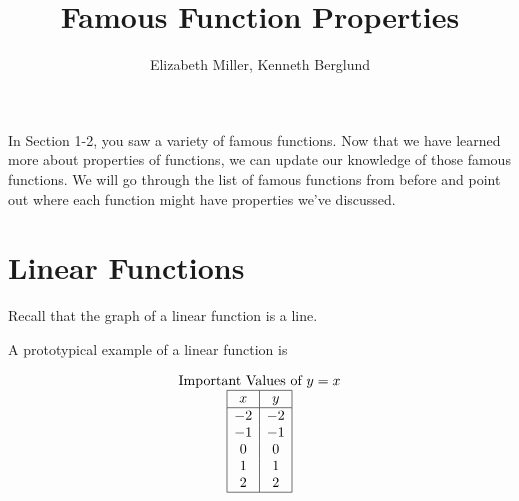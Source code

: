 \documentclass[nooutcomes]{ximera}
\author{Elizabeth Miller, Kenneth Berglund}
\title{Famous Function Properties}
\begin{document}
\begin{abstract}
\end{abstract}
\maketitle


In Section 1-2, you saw a variety of famous functions. Now that we have learned more about properties of functions, we can update our knowledge of those famous functions. We will go through the list of famous functions from before and point out where each function might have properties we've discussed.

\newpage


\section{Linear Functions}
Recall that the graph of a linear function is a line. 

\begin{example}
A prototypical example of a linear function is 

\begin{center}
\end{center}

\begin{center}
\end{center}


\[
\begin{array}{  c  }
\text{\normalfont Important Values of $y=x$} \\
 \begin{array}{|c|c|}
 \hline
 x & y\\
 \hline
 -2&-2\\
 -1&-1\\
 0&0\\
 1&1\\
 2&2\\
 \hline
\end{array}
\end{array}
\]

\end{example}
\end{document}
